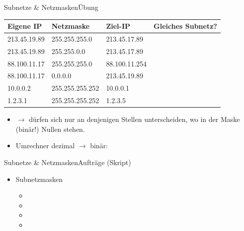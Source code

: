 \begin{frame}[fragile]{Subnetze \& Netzmasken}{Übung}
    \begin{table}[H]
        \centering
        \footnotesize
        \begin{tabular}{lllp{2cm}}

            \textbf{Eigene \acrshort{IP}} & \textbf{Netzmaske} & \textbf{Ziel-\acrshort{IP}} & \textbf{Gleiches \newline Subnetz?} \\\midrule

            213.45.19.89       & 255.255.255.0      & 213.45.17.89     &                                     \\\midrule

            213.45.19.89       & 255.255.0.0        & 213.45.17.89     &                                     \\\midrule

            88.100.11.17       & 255.255.255.0      & 88.100.11.254    &                                     \\\midrule

            88.100.11.17       & 0.0.0.0            & 213.45.19.89     &                                     \\\midrule

            10.0.0.2           & 255.255.255.252    & 10.0.0.1         &                                     \\\midrule
            1.2.3.1            & 255.255.255.252    & 1.2.3.5          &
        \end{tabular}
    \end{table}
    \begin{itemize}
        \item $\rightarrow$  dürfen sich nur an denjenigen Stellen unterscheiden, wo in der Maske (binär!) Nullen stehen.
        \item Umrechner dezimal $\rightarrow$ binär: 
    \end{itemize}
\end{frame}

\begin{frame}[fragile]{Subnetze \& Netzmasken}{Aufträge (Skript)}
    \begin{itemize}
        \item Subnetzmasken
              \begin{itemize}
                  \item {}
                  \item {}
                  \item {}
                  \item {}
              \end{itemize}
    \end{itemize}
\end{frame}

